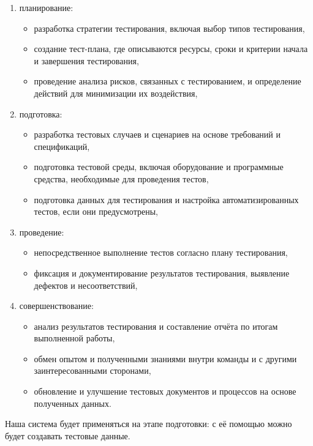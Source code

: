 \begin{enumerate}
    \item планирование:
    \begin{itemize}
        \item разработка стратегии тестирования, включая выбор типов тестирования,
        \item создание тест-плана, где описываются ресурсы, сроки и критерии начала и завершения тестирования,
        \item проведение анализа рисков, связанных с тестированием, и определение действий для минимизации их воздействия,
    \end{itemize}

    \item подготовка:
    \begin{itemize}
        \item разработка тестовых случаев и сценариев на основе требований и спецификаций,
        \item подготовка тестовой среды, включая оборудование и программные средства, необходимые для проведения тестов,
        \item подготовка данных для тестирования и настройка автоматизированных тестов, если они предусмотрены,
    \end{itemize}

    \item проведение:
    \begin{itemize}
        \item непосредственное выполнение тестов согласно плану тестирования,
        \item фиксация и документирование результатов тестирования, выявление дефектов и несоответствий,
    \end{itemize}

    \item совершенствование:
    \begin{itemize}
        \item анализ результатов тестирования и составление отчёта по итогам выполненной работы,
        \item обмен опытом и полученными знаниями внутри команды и с другими заинтересованными сторонами,
        \item обновление и улучшение тестовых документов и процессов на основе полученных данных.
    \end{itemize}
\end{enumerate}

Наша система будет применяться на этапе подготовки: с её помощью можно будет создавать тестовые данные.

